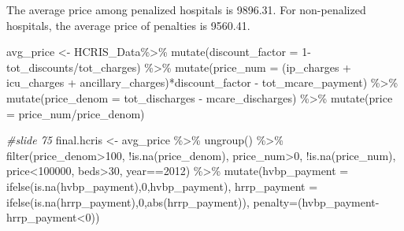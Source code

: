 \documentclass[
]{article}
\newenvironment{Shaded}{\begin{snugshade}}{\end{snugshade}}
\newcommand{\AttributeTok}[1]{\textcolor[rgb]{0.77,0.63,0.00}{#1}}
\newcommand{\CommentTok}[1]{\textcolor[rgb]{0.56,0.35,0.01}{\textit{#1}}}
\newcommand{\DecValTok}[1]{\textcolor[rgb]{0.00,0.00,0.81}{#1}}
\newcommand{\FunctionTok}[1]{\textcolor[rgb]{0.00,0.00,0.00}{#1}}
\newcommand{\NormalTok}[1]{#1}
\newcommand{\OtherTok}[1]{\textcolor[rgb]{0.56,0.35,0.01}{#1}}
\newcommand{\SpecialCharTok}[1]{\textcolor[rgb]{0.00,0.00,0.00}{#1}}
\begin{document}
The average price among penalized hospitals is 9896.31. For
non-penalized hospitals, the average price of penalties is 9560.41.

\begin{Shaded}
\begin{Highlighting}[]
\NormalTok{avg\_price }\OtherTok{\textless{}{-}}\NormalTok{ HCRIS\_Data}\SpecialCharTok{\%\textgreater{}\%}
\FunctionTok{mutate}\NormalTok{(}\AttributeTok{discount\_factor =} \DecValTok{1}\SpecialCharTok{{-}}\NormalTok{tot\_discounts}\SpecialCharTok{/}\NormalTok{tot\_charges) }\SpecialCharTok{\%\textgreater{}\%}
\FunctionTok{mutate}\NormalTok{(}\AttributeTok{price\_num =}\NormalTok{ (ip\_charges }\SpecialCharTok{+}\NormalTok{ icu\_charges }\SpecialCharTok{+}\NormalTok{ ancillary\_charges)}\SpecialCharTok{*}\NormalTok{discount\_factor }\SpecialCharTok{{-}}\NormalTok{ tot\_mcare\_payment) }\SpecialCharTok{\%\textgreater{}\%}
\FunctionTok{mutate}\NormalTok{(}\AttributeTok{price\_denom =}\NormalTok{ tot\_discharges }\SpecialCharTok{{-}}\NormalTok{ mcare\_discharges) }\SpecialCharTok{\%\textgreater{}\%}
\FunctionTok{mutate}\NormalTok{(}\AttributeTok{price =}\NormalTok{ price\_num}\SpecialCharTok{/}\NormalTok{price\_denom)}

\CommentTok{\#slide 75}
\NormalTok{final.hcris }\OtherTok{\textless{}{-}}\NormalTok{ avg\_price }\SpecialCharTok{\%\textgreater{}\%} \FunctionTok{ungroup}\NormalTok{() }\SpecialCharTok{\%\textgreater{}\%}
  \FunctionTok{filter}\NormalTok{(price\_denom}\SpecialCharTok{\textgreater{}}\DecValTok{100}\NormalTok{, }\SpecialCharTok{!}\FunctionTok{is.na}\NormalTok{(price\_denom),}
\NormalTok{         price\_num}\SpecialCharTok{\textgreater{}}\DecValTok{0}\NormalTok{, }\SpecialCharTok{!}\FunctionTok{is.na}\NormalTok{(price\_num),}
\NormalTok{         price}\SpecialCharTok{\textless{}}\DecValTok{100000}\NormalTok{,}
\NormalTok{         beds}\SpecialCharTok{\textgreater{}}\DecValTok{30}\NormalTok{, year}\SpecialCharTok{==}\DecValTok{2012}\NormalTok{) }\SpecialCharTok{\%\textgreater{}\%}
  \FunctionTok{mutate}\NormalTok{(}\AttributeTok{hvbp\_payment =} \FunctionTok{ifelse}\NormalTok{(}\FunctionTok{is.na}\NormalTok{(hvbp\_payment),}\DecValTok{0}\NormalTok{,hvbp\_payment),}
         \AttributeTok{hrrp\_payment =} \FunctionTok{ifelse}\NormalTok{(}\FunctionTok{is.na}\NormalTok{(hrrp\_payment),}\DecValTok{0}\NormalTok{,}\FunctionTok{abs}\NormalTok{(hrrp\_payment)),}
         \AttributeTok{penalty=}\NormalTok{(hvbp\_payment}\SpecialCharTok{{-}}\NormalTok{hrrp\_payment}\SpecialCharTok{\textless{}}\DecValTok{0}\NormalTok{))}




\end{Highlighting}
\end{Shaded}
\end{document}
